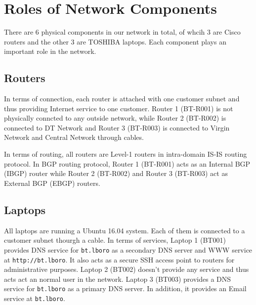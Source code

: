 \section{Roles of Network Components}
\label{sec:components}

There are 6 physical components in our network in total, of whcih 3 are Cisco routers and the other 3 are TOSHIBA laptops. Each component plays an important role in the network.

\subsection{Routers}
In terms of connection, each router is attached with one customer subnet and thus providing Internet service to one customer. Router 1 (BT-R001) is not physically conncted to any outside network, while Router 2 (BT-R002) is connected to DT Network and Router 3 (BT-R003) is connected to Virgin Network and Central Network through cables.

In terms of routing, all routers are Level-1 routers in intra-domain IS-IS routing protocol. In BGP routing protocol, Router 1 (BT-R001) acts as an Internal BGP (IBGP) router while Router 2 (BT-R002) and Router 3 (BT-R003) act as External BGP (EBGP) routers. 



\subsection{Laptops}

All laptops are running a Ubuntu 16.04 system. Each of them is connected to a customer subnet thourgh a cable. 
In terms of services, Laptop 1 (BT001) provides DNS service for \texttt{bt.lboro} as a secondary DNS server and WWW service at \texttt{http://bt.lboro}. It also acts as a secure SSH access point to routers for administrative purposes. 
Laptop 2 (BT002) doesn't provide any service and thus acts act an normal user in the network. 
Laptop 3 (BT003) provides a DNS service for \texttt{bt.lboro} as a primary DNS server. In addition, it provides an Email service at \texttt{bt.lboro}.

